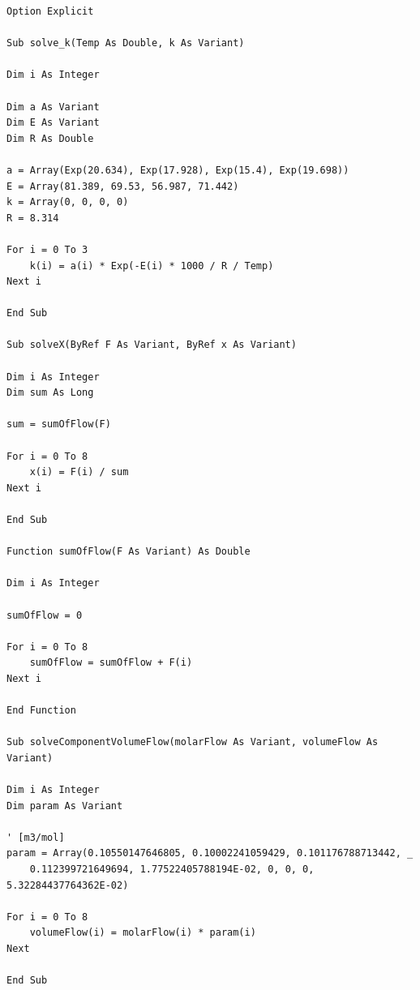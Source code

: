 \documentclass[a4j]{jsreport}
\begin{document}
\begin{lstlisting}[caption=関数群]
Option Explicit

Sub solve_k(Temp As Double, k As Variant)

Dim i As Integer

Dim a As Variant
Dim E As Variant
Dim R As Double

a = Array(Exp(20.634), Exp(17.928), Exp(15.4), Exp(19.698))
E = Array(81.389, 69.53, 56.987, 71.442)
k = Array(0, 0, 0, 0)
R = 8.314

For i = 0 To 3
    k(i) = a(i) * Exp(-E(i) * 1000 / R / Temp)
Next i

End Sub

Sub solveX(ByRef F As Variant, ByRef x As Variant)

Dim i As Integer
Dim sum As Long

sum = sumOfFlow(F)

For i = 0 To 8
    x(i) = F(i) / sum
Next i

End Sub

Function sumOfFlow(F As Variant) As Double

Dim i As Integer

sumOfFlow = 0

For i = 0 To 8
    sumOfFlow = sumOfFlow + F(i)
Next i

End Function

Sub solveComponentVolumeFlow(molarFlow As Variant, volumeFlow As Variant)

Dim i As Integer
Dim param As Variant

' [m3/mol]
param = Array(0.10550147646805, 0.10002241059429, 0.101176788713442, _
    0.112399721649694, 1.77522405788194E-02, 0, 0, 0, 5.32284437764362E-02)

For i = 0 To 8
    volumeFlow(i) = molarFlow(i) * param(i)
Next

End Sub
\end{lstlisting}
\end{document}
